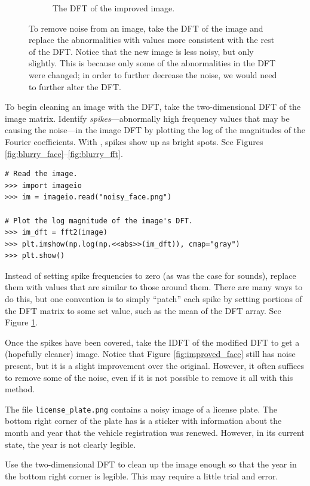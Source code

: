 \begin{figure}[H]
\begin{subfigure}{.4\textwidth}
    \caption{The DFT of the improved image.}
    \label{fig:covered_fft}
\end{subfigure}
\caption{To remove noise from an image, take the DFT of the image and replace the abnormalities with values more consistent with the rest of the DFT.
Notice that the new image is less noisy, but only slightly.
This is because only some of the abnormalities in the DFT were changed; in order to further decrease the noise, we would need to further alter the DFT.}
\label{fig:image_fft}
\end{figure}

To begin cleaning an image with the DFT, take the two-dimensional DFT of the image matrix.
Identify \emph{spikes}---abnormally high frequency values that may be causing the noise---in the image DFT by plotting the log of the magnitudes of the Fourier coefficients.
With , spikes show up as bright spots.
See Figures \ref{fig:blurry_face}--\ref{fig:blurry_fft}.

\begin{lstlisting}
# Read the image.
>>> import imageio
>>> im = imageio.read("noisy_face.png")

# Plot the log magnitude of the image's DFT.
>>> im_dft = fft2(image)
>>> plt.imshow(np.log(np.<<abs>>(im_dft)), cmap="gray")
>>> plt.show()
\end{lstlisting}

Instead of setting spike frequencies to zero (as was the case for sounds), replace them with values that are similar to those around them.
There are many ways to do this, but one convention is to simply ``patch'' each spike by setting portions of the DFT matrix to some set value, such as the mean of the DFT array.
See Figure \ref{fig:covered_fft}.

Once the spikes have been covered, take the IDFT of the modified DFT to get a (hopefully cleaner) image.
Notice that Figure \ref{fig:improved_face} still has noise present, but it is a slight improvement over the original.
However, it often suffices to remove some of the noise, even if it is not possible to remove it all with this method.

\begin{problem} %
The file \texttt{license\_plate.png} contains a noisy image of a license plate.
The bottom right corner of the plate has is a sticker with information about the month and year that the vehicle registration was renewed.
However, in its current state, the year is not clearly legible.

Use the two-dimensional DFT to clean up the image enough so that the year in the bottom right corner is legible.
This may require a little trial and error.
\end{problem}

